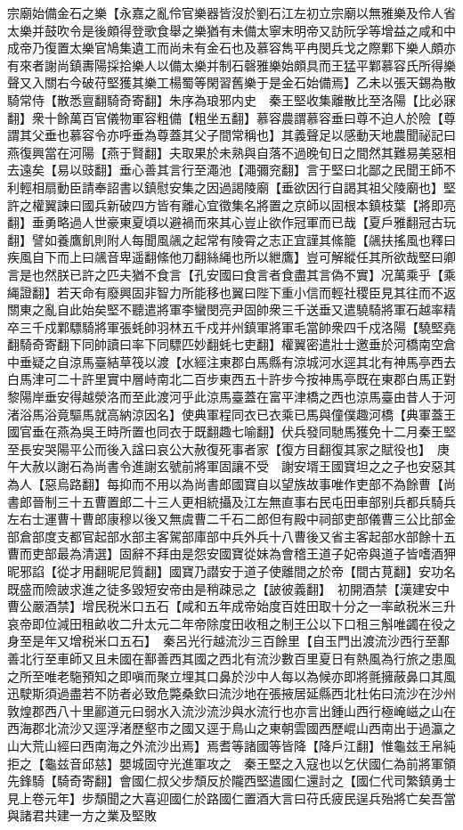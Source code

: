 宗廟始備金石之樂【永嘉之亂伶官樂器皆沒於劉石江左初立宗廟以無雅樂及伶人省太樂并鼓吹令是後頗得登歌食舉之樂猶有未備太寧末明帝又訪阮孚等增益之咸和中成帝乃復置太樂官鳩集遺工而尚未有金石也及慕容雋平冉閔兵戈之際鄴下樂人頗亦有來者謝尚鎮夀陽採拾樂人以備太樂并制石磬雅樂始頗具而王猛平鄴慕容氏所得樂聲又入關右今破苻堅獲其樂工楊蜀等閑習舊樂于是金石始備焉】乙未以張天錫為散騎常侍【散悉亶翻騎奇寄翻】朱序為琅邪内史　秦王堅收集離散比至洛陽【比必寐翻】衆十餘萬百官儀物軍容粗備【粗坐五翻】慕容農謂慕容垂曰尊不迫人於險【尊謂其父垂也慕容令亦呼垂為尊蓋其父子間常稱也】其義聲足以感動天地農聞祕記曰燕復興當在河陽【燕于賢翻】夫取果於未熟與自落不過晚旬日之間然其難易美惡相去遠矣【易以豉翻】垂心善其言行至澠池【澠彌兖翻】言于堅曰北鄙之民聞王師不利輕相扇動臣請奉詔書以鎮慰安集之因過謁陵廟【垂欲因行自謁其祖父陵廟也】堅許之權翼諫曰國兵新破四方皆有離心宜徵集名將置之京師以固根本鎮枝葉【將即亮翻】垂勇略過人世豪東夏頃以避禍而來其心豈止欲作冠軍而已哉【夏戶雅翻冠古玩翻】譬如養鷹飢則附人每聞風飊之起常有陵霄之志正宜謹其絛籠【飊扶搖風也釋曰疾風自下而上曰飊音卑遥翻絛他刀翻絲䋲也所以紲鷹】豈可解縱任其所欲哉堅曰卿言是也然朕已許之匹夫猶不食言【孔安國曰食言者食盡其言偽不實】况萬乘乎【乘䋲證翻】若天命有廢興固非智力所能移也翼曰陛下重小信而輕社稷臣見其往而不返關東之亂自此始矣堅不聽遣將軍李蠻閔亮尹固帥衆三千送垂又遣驍騎將軍石越率精卒三千戍鄴驃騎將軍張蚝帥羽林五千戍并州鎮軍將軍毛當帥衆四千戍洛陽【驍堅堯翻騎奇寄翻下同帥讀曰率下同驃匹妙翻蚝七吏翻】權翼密遣壯士邀垂於河橋南空倉中垂疑之自涼馬臺結草筏以渡【水經注東郡白馬縣有涼城河水逕其北有神馬亭西去白馬津可二十許里實中層峙南北二百步東西五十許步今按神馬亭既在東郡白馬正對黎陽岸垂安得越滎洛而至此渡河乎此涼馬臺蓋在富平津橋之西也涼馬臺由昔人于河渚浴馬浴竟驅馬就高納涼因名】使典軍程同衣已衣乘已馬與僮僕趣河橋【典軍蓋王國官垂在燕為吳王時所置也同衣于既翻趣七喻翻】伏兵發同馳馬獲免十二月秦王堅至長安哭陽平公而後入諡曰哀公大赦復死事者家【復方目翻復其家之賦役也】　庚午大赦以謝石為尚書令進謝玄號前將軍固讓不受　謝安壻王國寶坦之之子也安惡其為人【惡烏路翻】每抑而不用以為尚書郎國寶自以望族故事唯作吏部不為餘曹【尚書郎晉制三十五曹置郎二十三人更相統攝及江左無直事右民屯田車部别兵都兵騎兵左右士運曹十曹郎康穆以後又無虞曹二千石二郎但有殿中祠部吏部儀曹三公比部金部倉部度支都官起部水部主客駕部庫部中兵外兵十八曹後又省主客起部水部餘十五曹而吏部最為清選】固辭不拜由是怨安國寶從妹為會稽王道子妃帝與道子皆嗜酒狎昵邪諂【從才用翻昵尼質翻】國寶乃譛安于道子使離間之於帝【間古莧翻】安功名既盛而險詖求進之徒多毀短安帝由是稍疎忌之【詖彼義翻】　初開酒禁【漢建安中曹公嚴酒禁】增民税米口五石【咸和五年成帝始度百姓田取十分之一率畝税米三升哀帝即位減田租畝收二升太元二年帝除度田收租之制王公以下口租三斛唯蠲在役之身至是年又增税米口五石】　秦呂光行越流沙三百餘里【自玉門出渡流沙西行至鄯善北行至車師又且未國在鄯善西其國之西北有流沙數百里夏日有熱風為行旅之患風之所至唯老駞預知之即嗔而聚立埋其口鼻於沙中人每以為候亦即將氈擁蔽鼻口其風迅駛斯須過盡若不防者必致危斃桑欽曰流沙地在張掖居延縣西北杜佑曰流沙在沙州敦煌郡西八十里酈道元曰弱水入流沙流沙與水流行也亦言出鍾山西行極崦嵫之山在西海郡北流沙又逕浮渚歷壑市之國又逕于鳥山之東朝雲國西歷崐山西南出于過瀛之山大荒山經曰西南海之外流沙出焉】焉耆等諸國等皆降【降戶江翻】惟龜兹王帛純拒之【龜兹音邱慈】嬰城固守光進軍攻之　秦王堅之入寇也以乞伏國仁為前將軍領先鋒騎【騎奇寄翻】會國仁叔父步頹反於隴西堅遣國仁還討之【國仁代司繁鎮勇士見上卷元年】步頹聞之大喜迎國仁於路國仁置酒大言曰苻氏疲民逞兵殆將亡矣吾當與諸君共建一方之業及堅敗